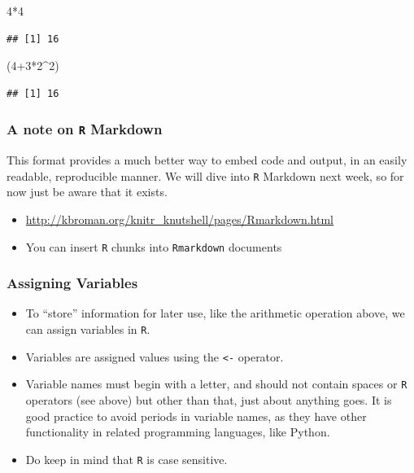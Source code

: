 \documentclass[
]{book}
\newenvironment{Shaded}{\begin{snugshade}}{\end{snugshade}}
\newcommand{\DecValTok}[1]{\textcolor[rgb]{0.00,0.00,0.81}{#1}}
\newcommand{\NormalTok}[1]{#1}
\newcommand{\SpecialCharTok}[1]{\textcolor[rgb]{0.00,0.00,0.00}{#1}}
\begin{document}
\begin{Shaded}
\begin{Highlighting}[]
\DecValTok{4}\SpecialCharTok{*}\DecValTok{4}
\end{Highlighting}
\end{Shaded}

\begin{verbatim}
## [1] 16
\end{verbatim}

\begin{Shaded}
\begin{Highlighting}[]
\NormalTok{(}\DecValTok{4}\SpecialCharTok{+}\DecValTok{3}\SpecialCharTok{*}\DecValTok{2}\SpecialCharTok{\^{}}\DecValTok{2}\NormalTok{)}
\end{Highlighting}
\end{Shaded}

\begin{verbatim}
## [1] 16
\end{verbatim}

\hypertarget{a-note-on-r-markdown}{%
\subsubsection{\texorpdfstring{A note on \texttt{R} Markdown}{A note on R Markdown}}\label{a-note-on-r-markdown}}

This format provides a much better way to embed code and output, in an easily readable, reproducible manner. We will dive into \texttt{R} Markdown next week, so for now just be aware that it exists.

\begin{itemize}
\item
  \url{http://kbroman.org/knitr_knutshell/pages/Rmarkdown.html}
\item
  You can insert \texttt{R} chunks into \texttt{Rmarkdown} documents
\end{itemize}

\hypertarget{assigning-variables}{%
\subsubsection{Assigning Variables}\label{assigning-variables}}

\begin{itemize}
\item
  To ``store'' information for later use, like the arithmetic operation above, we can assign variables in \texttt{R}.
\item
  Variables are assigned values using the \texttt{\textless{}-} operator.
\item
  Variable names must begin with a letter, and should not contain spaces or \texttt{R} operators (see above) but other than that, just about anything goes. It is good practice to avoid periods in variable names, as they have other functionality in related programming languages, like Python.
\item
  Do keep in mind that \texttt{R} is case sensitive.
\end{itemize}
\end{document}
